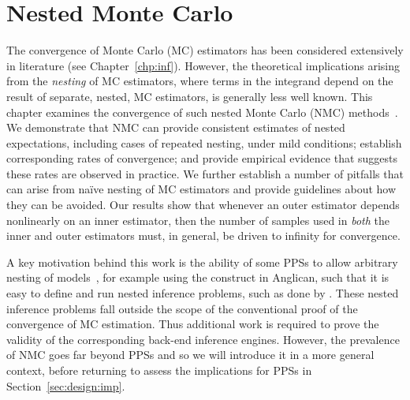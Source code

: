 
\chapter{Nested Monte Carlo}
\label{chp:nest}

The convergence of Monte Carlo (MC) estimators has been considered extensively in 
literature (see Chapter~\ref{chp:inf}).  However, the theoretical implications
arising from the \emph{nesting} of MC estimators, where terms in the integrand depend on the
result of separate, nested, MC estimators, is generally less well known.
This chapter examines the convergence of such nested Monte Carlo (NMC) 
methods~\citep{rainforth2016pitfalls,rainforth2017pitfalls}.
We demonstrate that NMC can provide consistent estimates of 
nested expectations, including cases of repeated nesting, under mild conditions;
establish corresponding rates of convergence;
and provide empirical evidence that suggests these rates are observed in practice.
We further establish a number of pitfalls that can arise from na\"{i}ve nesting of MC estimators
and provide guidelines about how they can be avoided.
Our results show that whenever an outer estimator depends nonlinearly on an inner
estimator, then the number of samples used in \emph{both} the inner and outer estimators
must, in general, be driven to infinity for convergence.  

A key motivation behind this work is the ability of some PPSs to allow
arbitrary nesting of models~\cite{stuhlmuller2014reasoning}, for example using
 the \conditional construct in Anglican,
such that it is easy to define and run nested inference problems, such as done
by \citep{ouyang2016practical,le2016nested}. These nested inference problems fall outside the
scope of the conventional proof of the convergence of MC estimation. Thus additional
work is required to prove the validity of the corresponding back-end inference engines.
However, the prevalence of NMC goes far beyond PPSs and so we will introduce it in
a more general context, before returning to assess the implications for PPSs in Section~\ref{sec:design:imp}.










